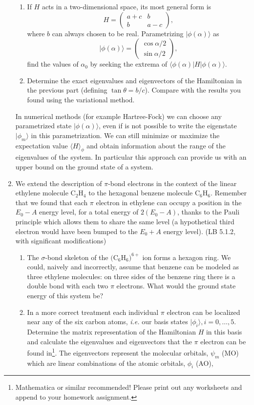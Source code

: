 \documentclass[letterpaper,11pt]{article}
\begin{document}
\begin{enumerate}
\begin{enumerate}
    \item \label{prob:varmethod:2dsystem}
    If $H$ acts in a two-dimensional space, its most general form is
    $$ H = \left( \begin{array}{cc} a+c & b \\ b & a-c \end{array} \right), $$
    where $b$ can always chosen to be real. Parametrizing $|\phi(\alpha)\rangle$ as
    $$ |\phi(\alpha)\rangle = \left( \begin{array}{c} \cos \alpha/2 \\ \sin\alpha/2 \end{array} \right), $$
    find the values of $\alpha_0$ by seeking the extrema of $\langle \phi(\alpha)|H|\phi(\alpha) \rangle$.
    \item Determine the exact eigenvalues and eigenvectors of the Hamiltonian in the previous part (defining $\tan \theta = b/c$). Compare with the results you found using the variational method.
  \end{enumerate}
  In numerical methods (for example Hartree-Fock) we can choose any parametrized state $|\phi(\alpha)\rangle$, even if is not possible to write the eigenstate $|\phi_m\rangle$ in this parametrization. We can still minimize or maximize the expectation value $\langle H \rangle_{\phi}$ and obtain information about the range of the eigenvalues of the system. In particular this approach can provide us with an upper bound on the ground state of a system.
  \item We extend the description of $\pi$-bond electrons in the context of the linear ethylene molecule C$_2$H$_4$ to the hexagonal benzene molecule C$_6$H$_6$. Remember that we found that each $\pi$ electron in ethylene can occupy a position in the $E_0 - A$ energy level, for a total energy of $2(E_0 - A)$, thanks to the Pauli principle which allows them to share the same level (a hypothetical third electron would have been bumped to the $E_0 + A$ energy level).
  (LB 5.1.2, with significant modifications)
  \begin{enumerate}
    \item The $\sigma$-bond skeleton of the $($C$_6$H$_6)^{6+}$ ion forms a hexagon ring. We could, naively and incorrectly, assume that benzene can be modeled as three ethylene molecules: on three sides of the benzene ring there is a double bond with each two $\pi$ electrons. What would the ground state energy of this system be?
    \item In a more correct treatment each individual $\pi$ electron can be localized near any of the six carbon atoms, \emph{i.e.} our basis states $|\phi_i\rangle, i = 0,\ldots,5$. Determine the matrix representation of the Hamiltonian $H$ in this basis and calculate the eigenvalues and eigenvectors that the $\pi$ electron can be found in\footnote{Mathematica or similar recommended! Please print out any worksheets and append to your homework assignment.}. The eigenvectors represent the molecular orbitals, $\psi_m$ (MO) which are linear combinations of the atomic orbitals, $\phi_i$ (AO),

\end{enumerate}
\end{enumerate}
\end{document}
